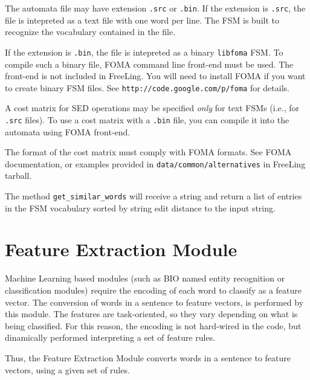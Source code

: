 \documentclass[a4paper]{book}
\begin{document}
  The automata file may have extension \verb#.src# or  \verb#.bin#.
  If the extension is \verb#.src#, the file is intepreted as a text
  file with one word per line. The FSM is built to recognize the 
  vocabulary contained in the file.

  If the extension is \verb#.bin#, the file is intepreted as a binary
  \texttt{libfoma} FSM.  To compile such a binary file, FOMA command
  line front-end must be used.  The front-end is not included in
  FreeLing. You will need to install FOMA if you want to create binary
  FSM files. See \texttt{http://code.google.com/p/foma} for details.

  A cost matrix for SED operations may be specified \textit{only} for 
  text FSMs (i.e., for \verb#.src# files). 
  To use a cost matrix with a \verb#.bin# file, you can compile
  it into the automata using FOMA front-end.

  The format of the cost matrix must comply with FOMA formats.  See
  FOMA documentation, or examples provided in
  \verb#data/common/alternatives# in FreeLing tarball.

  The method \verb#get_similar_words# will receive a string and 
  return a list of entries in the FSM vocabulary sorted by string 
  edit distance to the input string.

\section{Feature Extraction Module}
\label{sec-rgf}

  Machine Learning based modules (such as BIO named entity recognition
  or classification modules) require the encoding of each word to
  classify as a feature vector.  The conversion of words in a sentence
  to feature vectors, is performed by this module. The features are
  task-oriented, so they vary depending on what is being
  classified. For this reason, the encoding is not hard-wired in the
  code, but dinamically performed interpreting a set of feature rules.

  Thus, the Feature Extraction Module converts words in a sentence to
  feature vectors, using a given set of rules.
\end{document}
